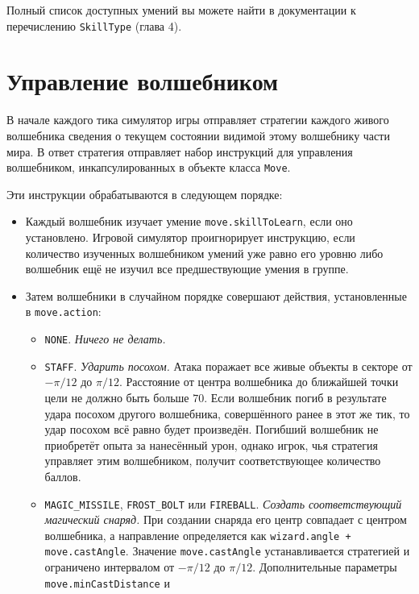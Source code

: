 Полный список доступных умений вы можете найти в документации к перечислению \texttt{SkillType} (глава 4).

\section{Управление волшебником}

В начале каждого тика симулятор игры отправляет стратегии каждого живого волшебника сведения о текущем состоянии видимой этому волшебнику
части мира. В ответ стратегия отправляет набор инструкций для управления волшебником, инкапсулированных в объекте класса \texttt{Move}.

Эти инструкции обрабатываются в следующем порядке:
\begin{itemize}
    \item Каждый волшебник изучает умение \texttt{move.skillToLearn}, если оно установлено. Игровой симулятор проигнорирует инструкцию,
          если количество изученных волшебником умений уже равно его уровню либо волшебник ещё не изучил все предшествующие умения в группе.
    \item Затем волшебники в случайном порядке совершают действия, установленные в \texttt{move.action}:
          \begin{itemize}
              \item \texttt{NONE}. \textit{Ничего не делать.}
              \item \texttt{STAFF}. \textit{Ударить посохом.} Атака поражает все живые объекты в секторе от $-\pi / 12$ до $\pi / 12$.
                    Расстояние от центра волшебника до ближайшей точки цели не должно быть больше $70$. Если волшебник погиб в результате
                    удара посохом другого волшебника, совершённого ранее в этот же тик, то удар посохом всё равно будет произведён. Погибший
                    волшебник не приобретёт опыта за нанесённый урон, однако игрок, чья стратегия управляет этим волшебником, получит
                    соответствующее количество баллов.
              \item \texttt{MAGIC\_MISSILE}, \texttt{FROST\_BOLT} или \texttt{FIREBALL}. \textit{Создать соответствующий магический снаряд.}
                    При создании снаряда его центр совпадает с центром волшебника, а направление определяется как
                    \texttt{wizard.angle + move.castAngle}. Значение \texttt{move.castAngle} устанавливается стратегией и ограничено
                    интервалом от $-\pi / 12$ до $\pi / 12$. Дополнительные параметры \texttt{move.minCastDistance} и

\end{itemize}
\end{itemize}
